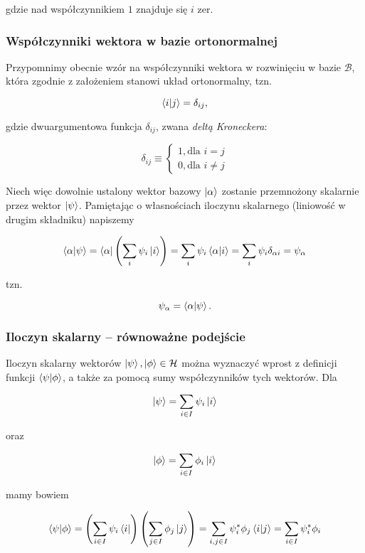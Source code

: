 \documentclass[a4paper,12pt]{article}
\begin{document}
gdzie nad współczynnikiem $1$ znajduje się $i$ zer.

\subsubsection{Współczynniki wektora w bazie ortonormalnej}

Przypomnimy obecnie wzór na współczynniki wektora w rozwinięciu w bazie $\mathcal{B}$, która zgodnie z założeniem stanowi układ ortonormalny, tzn. 

$$
    \bra{i}\ket{j} = \delta_{ij},
$$

gdzie dwuargumentowa funkcja $\delta_{ij}$, zwana \textit{deltą Kroneckera}:

$$
    \delta_{ij} \equiv
    \begin{cases}
        1, \text{dla } i = j \\
        0, \text{dla } i \neq j
    \end{cases}
$$

Niech więc dowolnie ustalony wektor bazowy $\ket{\alpha}$ zostanie przemnożony skalarnie przez wektor $\ket{\psi}$. Pamiętając o własnościach iloczynu skalarnego (liniowość w drugim składniku) napiszemy 

$$
    \bra{\alpha}\ket{\psi} = \bra{\alpha}\left(\sum\limits_{i}\psi_{i}\ket{i}\right) = \sum\limits_{i}\psi_{i} \bra{\alpha}\ket{i} = \sum\limits_{i}\psi_{i}\delta_{\alpha i}=\psi_{\alpha}
$$

tzn.

$$
    \psi_{\alpha}=\bra{\alpha}\ket{\psi}.
$$

\subsubsection{Iloczyn skalarny -- równoważne podejście}

Iloczyn skalarny wektorów $\ket{\psi}, \ket{\phi} \in \mathcal{H}$ można wyznaczyć wprost z definicji funkcji $\bra{\psi}\ket{\phi}$, a także za pomocą sumy współczynników tych wektorów. Dla

$$
    \ket{\psi} = \sum\limits_{i\in I}\psi_{i}\ket{i}
$$

oraz

$$
    \ket{\phi} = \sum\limits_{i\in I}\phi_{i}\ket{i}
$$

mamy bowiem

$$
    \bra{\psi}\ket{\phi} = \left(\sum\limits_{i \in I}\psi_{i}\bra{i}\right)\left(\sum\limits_{j\in I}\phi_{j}\ket{j}\right) = \sum\limits_{i, j \in I}\psi_{i} ^ {*}\phi_{j}\bra{i}\ket{j}=\sum\limits_{i \in I}\psi_{i}^{*}\phi_{i}
$$
\end{document}
